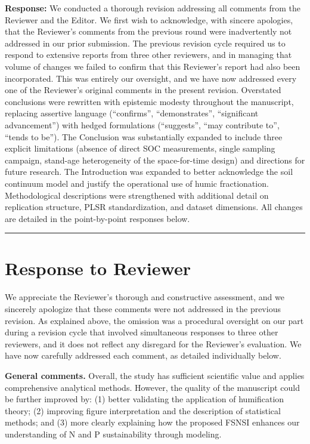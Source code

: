\documentclass[11pt,a4paper]{article}
\newcommand{\response}[1]{\par\noindent\textcolor{responsecolor}{\textbf{Response:}} #1}
\begin{document}
\response{We conducted a thorough revision addressing all comments from the Reviewer and the Editor. We first wish to acknowledge, with sincere apologies, that the Reviewer's comments from the previous round were inadvertently not addressed in our prior submission. The previous revision cycle required us to respond to extensive reports from three other reviewers, and in managing that volume of changes we failed to confirm that this Reviewer's report had also been incorporated. This was entirely our oversight, and we have now addressed every one of the Reviewer's original comments in the present revision. Overstated conclusions were rewritten with epistemic modesty throughout the manuscript, replacing assertive language (``confirms'', ``demonstrates'', ``significant advancement'') with hedged formulations (``suggests'', ``may contribute to'', ``tends to be''). The Conclusion was substantially expanded to include three explicit limitations (absence of direct SOC measurements, single sampling campaign, stand-age heterogeneity of the space-for-time design) and directions for future research. The Introduction was expanded to better acknowledge the soil continuum model and justify the operational use of humic fractionation. Methodological descriptions were strengthened with additional detail on replication structure, PLSR standardization, and dataset dimensions. All changes are detailed in the point-by-point responses below.}

\bigskip
\hrule
\bigskip

\section*{Response to Reviewer}

\noindent We appreciate the Reviewer's thorough and constructive assessment, and we sincerely apologize that these comments were not addressed in the previous revision. As explained above, the omission was a procedural oversight on our part during a revision cycle that involved simultaneous responses to three other reviewers, and it does not reflect any disregard for the Reviewer's evaluation. We have now carefully addressed each comment, as detailed individually below.

\bigskip


\begin{reviewerbox}
\textbf{General comments.} Overall, the study has sufficient scientific value and applies comprehensive analytical methods. However, the quality of the manuscript could be further improved by: (1) better validating the application of humification theory; (2) improving figure interpretation and the description of statistical methods; and (3) more clearly explaining how the proposed FSNSI enhances our understanding of N and P sustainability through modeling.
\end{reviewerbox}
\end{document}
